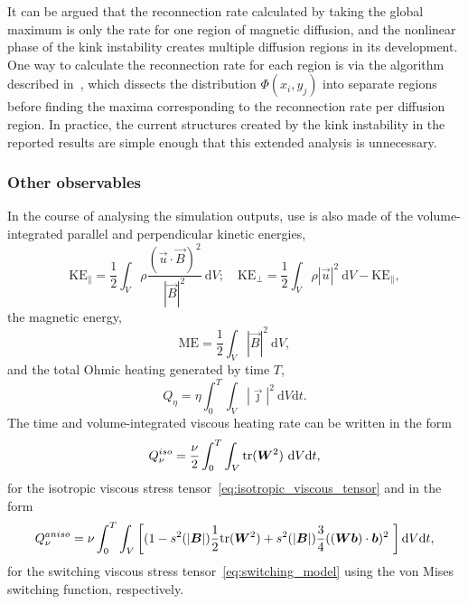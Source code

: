 It can be argued that the reconnection rate calculated by taking the global maximum is only the rate for one region of magnetic diffusion, and the nonlinear phase of the kink instability creates multiple diffusion regions in its development. One way to calculate the reconnection rate for each region is via the algorithm described in~\cite{pontinDynamicsBraidedCoronal2011}, which dissects the distribution $\Phi(x_i, y_j)$ into separate regions before finding the maxima corresponding to the reconnection rate per diffusion region. In practice, the current structures created by the kink instability in the reported results are simple enough that this extended analysis is unnecessary.

\subsubsection{Other observables}

In the course of analysing the simulation outputs, use is also made of the volume-integrated parallel and perpendicular kinetic energies,
\begin{equation}
  \label{eq:kinetic_energies}
  \text{KE}_{\parallel} = \frac{1}{2} \int_V \rho\frac{(\vec{u}\cdot\vec{B})^2}{|\vec{B}|^2}\ \text{d}V; \quad
  \text{KE}_{\perp} = \frac{1}{2} \int_V \rho|\vec{u}|^2\ \text{d}V - \text{KE}_{\parallel},
\end{equation}
the magnetic energy,
\begin{equation}
  \label{eq:magnetic_energy}
   \text{ME} = \frac12\int_V |\vec{B}|^2\ \text{d}V,
\end{equation}
and the total Ohmic heating generated by time $T$,
\begin{equation}
  \label{eq:ohmic_heating}
  Q_{\eta} = \eta \int_0^{T} \int_V |\vec{\jmath}|^2\ \text{d}V \text{d}t.
\end{equation}
The time and volume-integrated viscous heating rate can be written
in the form
\begin{equation}
  \label{eq:iso_viscous_heating}
  Q_{\nu}^{iso} = \frac{\nu}{2} \int_0^T \int_V
  \text{tr}({\bm W}^2)\  \text{d}V \text{d}t,
\end{equation}
for the isotropic viscous stress
tensor~\eqref{eq:isotropic_viscous_tensor} and in the form
\begin{equation}
  \label{eq:aniso_viscous_heating}
  Q_{\nu}^{aniso} = \nu \int_0^T \int_V \left[ (1-s^2(|{\bm B}|)\frac{1}{2}\text{tr}({\bm W}^2) + s^2(|{\bm B}|)\frac{3 }{4} (({\bm W} {\bm b}) \cdot {\bm b})^2\ \right] \text{d}V \text{d}t,
\end{equation}
for the switching viscous stress tensor~\eqref{eq:switching_model} using the von Mises switching function, respectively.

